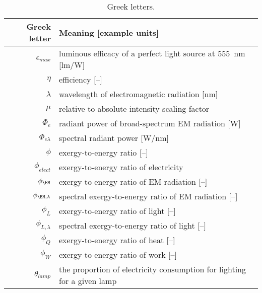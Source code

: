 \begin{table}
\centering %
\caption{Greek letters.}
\begin{tabular}{r l}
  \toprule
  Greek letter & Meaning [example units] \\
  \midrule
  $\epsilon_{max}$ & luminous efficacy of a perfect light source at 555~nm [lm/W] \\
  $\eta$ & efficiency [--] \\
  $\lambda$ & wavelength of electromagnetic radiation [nm] \\
  $\mu$ & relative to absolute intensity scaling factor \\
  $\Phi_{e}$ & radiant power of broad-spectrum EM radiation [W] \\
  $\Phi_{e\lambda}$ & spectral radiant power [W\!/\!nm] \\
  $\phi$ & exergy-to-energy ratio [--] \\
  $\phi_{elect}$ & exergy-to-energy ratio of electricity \\
  $\phi_{\EM}$ & exergy-to-energy ratio of EM radiation [--] \\
  $\phi_{\EM,\lambda}$ & spectral exergy-to-energy ratio of EM radiation [--] \\
  $\phi_{L}$ & exergy-to-energy ratio of light [--] \\
  $\phi_{L,\lambda}$ & spectral exergy-to-energy ratio of light [--] \\
  $\phi_Q$ & exergy-to-energy ratio of heat [--] \\
  $\phi_W$ & exergy-to-energy ratio of work [--] \\
  $\theta_{lamp}$ & the proportion of electricity consumption for lighting for a given lamp \\
  \bottomrule
\end{tabular}
\label{tab:greek}
\end{table}


  


